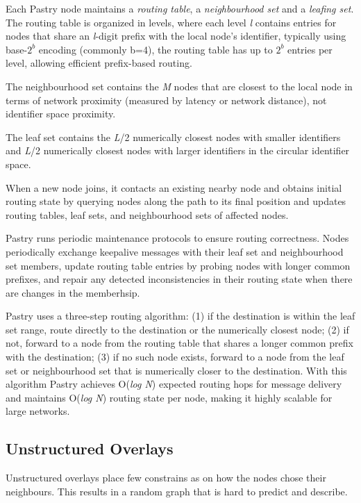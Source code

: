 Each Pastry node maintains a \textit{routing table}, a \textit{neighbourhood set}
and a \textit{leafing set}. The routing table is organized in levels, where each level
\textit{l} contains entries for nodes that share an \textit{l}-digit prefix with the local
node's identifier, typically using base-$2^b$ encoding (commonly b=4), the routing
table has up to $2^b$ entries per level, allowing efficient prefix-based routing.

The neighbourhood set contains the \textit{M} nodes that are closest to the local node in
terms of network proximity (measured by latency or network distance), not identifier space proximity.

The leaf set contains the \textit{L}/2 numerically closest nodes with smaller identifiers and \textit{L}/2
numerically closest nodes with larger identifiers in the circular identifier space.

When a new node joins, it contacts an existing nearby node and obtains initial routing state by querying
nodes along the path to its final position and updates routing tables, leaf sets,
and neighbourhood sets of affected nodes. 

Pastry runs periodic maintenance protocols to ensure routing correctness. Nodes periodically exchange
keepalive messages with their leaf set and neighbourhood set members, update routing table entries by probing
nodes with longer common prefixes, and repair any detected inconsistencies in their routing state when there are changes
in the memberhsip.

Pastry uses a three-step routing algorithm: (1) if the destination is within the leaf set range,
route directly to the destination or the numerically closest node; (2) if not, forward to a node from
the routing table that shares a longer common prefix with the destination; (3) if no such node exists,
forward to a node from the leaf set or neighbourhood set that is numerically closer to the destination.
With this algorithm Pastry achieves O(\textit{log N}) expected routing hops for message delivery and maintains
O(\textit{log N}) routing state per node, making it highly scalable for large networks.


\subsection{Unstructured Overlays}\label{sub:unstructured_overlays}

Unstructured overlays place few constrains as on how the nodes chose their
neighbours. This results in a random graph that is hard to predict and describe.

